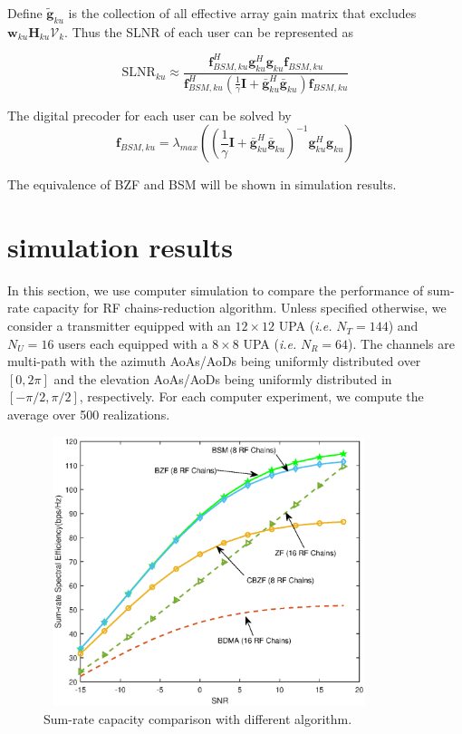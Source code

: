 \documentclass[conference]{IEEEtran}
\begin{document}
Define $\tilde{\bm{g}}_{ku}$ is the collection of all effective array gain matrix that excludes $\bm{w}_{ku} \bm{H}_{ku} \bm{\mathcal{V}}_k$. Thus the SLNR of each user can be represented as

\begin{equation}
\text{SLNR}_{ku} \approx \frac{\bm{f}_{BSM, ku}^H{\bm{g}}_{ku}^H{\bm{g}}_{ku} \bm{f}_{BSM, ku}}{\bm{f}_{BSM, ku}^H(\frac{1}{\gamma}\bm{I}+\bar{\bm{g}}_{ku}^H\bar{\bm{g}}_{ku})\bm{f}_{BSM, ku}}
\end{equation}

The digital precoder for each user can be solved by \cite{wang2012statistical}
\begin{equation}
	\bm{f}_{BSM,ku} = \lambda_{max}\left( \left(\frac{1}{\gamma}\bm{I}+\bar{\bm{g}}_{ku}^H\bar{\bm{g}}_{ku} \right)^{-1}{\bm{g}}_{ku}^H{\bm{g}}_{ku} \right)
\end{equation}

The equivalence of BZF and BSM  will be shown in simulation results.




\section{simulation results}
In this section, we use computer simulation to compare the performance of sum-rate capacity for RF chains-reduction algorithm. Unless specified otherwise, we consider a transmitter equipped with an $12\times 12$ UPA ({\em i.e.} $N_T=144$) and $N_U=16$ users each equipped with a $8\times 8$ UPA ({\em i.e.} $N_R=64$). The channels are multi-path with the azimuth AoAs/AoDs being uniformly distributed over $[0, 2\pi]$ and the elevation AoAs/AoDs being uniformly distributed in $[-\pi/2, \pi/2]$, respectively. For each computer experiment, we compute the average over 500 realizations.

\begin{figure}[ht]
	\begin{center}
		\includegraphics[width=3.8in,height=3.1in]{Figure/comparison.eps}
		\caption{Sum-rate capacity comparison with different algorithm.}\label{fig:MultiuserGain}
	\end{center}
\end{figure}
\end{document}
